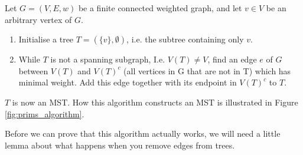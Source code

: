\documentclass[nobib]{tufte-handout}
\begin{document}
\begin{definition}
  Let $G = (V,E,w)$ be a finite connected weighted graph, and let $v \in V$ be an arbitrary vertex of $G$.
\begin{enumerate}
    \item Initialise a tree $T = (\{v\}, \emptyset)$, i.e. the subtree containing only $v$.
    \item While $T$ is not a spanning subgraph, I.e. $V(T) \neq V$, find an edge $e$ of $G$ between $V(T)$ and $V(T)^c$ (all vertices in G that are not in T) which has minimal weight. Add this edge together with its endpoint in $V(T)^c$ to $T$.
\end{enumerate}
  $T$ is now an MST. How this algorithm constructs an MST is illustrated in Figure \ref{fig:prims_algorithm}.
\end{definition}

Before we can prove that this algorithm actually works, we will need a little lemma about what happens when you remove edges from trees.
\end{document}
